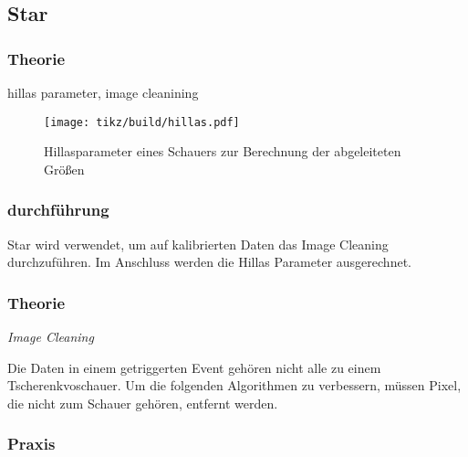 \subsection{Star}%
\label{sub:star}
\subsubsection{Theorie}
hillas parameter, image cleanining
\begin{figure}
	\centering
	\texttt{[image: tikz/build/hillas.pdf]}
	\caption{Hillasparameter eines Schauers zur Berechnung der abgeleiteten Größen}
	\label{fig:hillas}
\end{figure}

\subsubsection{durchführung}

Star wird verwendet, um auf kalibrierten Daten
das Image Cleaning
durchzuführen.
Im Anschluss werden die Hillas Parameter ausgerechnet.

\subsubsection*{Theorie}%
\label{ssub:theorie}

\textit{Image Cleaning}

Die Daten in einem getriggerten Event gehören nicht alle zu einem
Tscherenkvoschauer.
Um die folgenden Algorithmen zu verbessern,
müssen Pixel, die nicht zum Schauer gehören, entfernt werden.

\subsubsection*{Praxis}%
\label{ssub:praxis}
